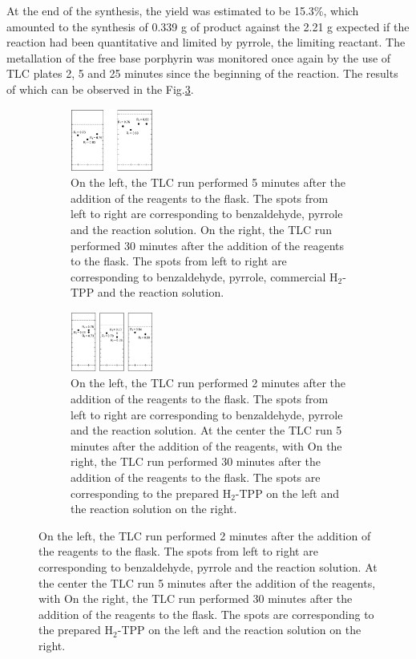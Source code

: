 \documentclass[num-refs]{wiley-article}
\begin{document}
At the end of the synthesis, the yield was estimated to be 15.3\%, which amounted to the synthesis of 0.339 g of product against the 2.21 g expected if the reaction had been quantitative and limited by pyrrole, the limiting reactant.
The metallation of the free base porphyrin was monitored once again by the use of TLC plates 2, 5 and 25 minutes since the beginning of the reaction.
The results of which can be observed in the Fig.\ref{TLC-Zn-TPP}.\\
\begin{figure}[t!]
    \begin{subfigure}
        \centering
        \includegraphics[width=0.3\textwidth]{TLC-h2-TPP}
        \caption{On the left, the TLC run performed 5 minutes after the addition of the reagents to the flask. The spots from left to right are corresponding to benzaldehyde, pyrrole and the reaction solution. On the right, the TLC run performed 30 minutes after the addition of the reagents to the flask. The spots from left to right are corresponding to benzaldehyde, pyrrole, commercial H$_{2}$-TPP and the reaction solution.}
        \label{tlc-h2tpp}
    \end{subfigure}
    \begin{subfigure}
        \centering
        \includegraphics[width=0.3\textwidth]{TLC-Zn-TPP}
        \caption{On the left, the TLC run performed 2 minutes after the addition of the reagents to the flask. The spots from left to right are corresponding to benzaldehyde, pyrrole and the reaction solution. At the center the TLC run 5 minutes after the addition of the reagents, with On the right, the TLC run performed 30 minutes after the addition of the reagents to the flask. The spots are corresponding to the prepared H$_{2}$-TPP on the left and the reaction solution on the right.}
        \label{TLC-Zn-TPP}
    \end{subfigure}
\end{figure}
\end{document}
